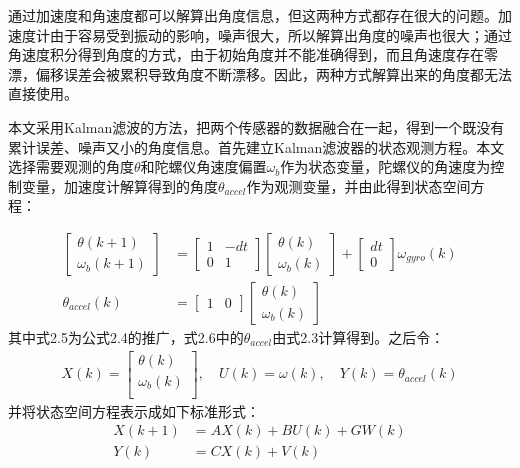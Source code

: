 通过加速度和角速度都可以解算出角度信息，但这两种方式都存在很大的问题。加速度计由于容易受到振动的影响，噪声很大，所以解算出角度的噪声也很大；通过角速度积分得到角度的方式，由于初始角度并不能准确得到，而且角速度存在零漂，偏移误差会被累积导致角度不断漂移。因此，两种方式解算出来的角度都无法直接使用。

本文采用Kalman滤波的方法，把两个传感器的数据融合在一起，得到一个既没有累计误差、噪声又小的角度信息。首先建立Kalman滤波器的状态观测方程。本文选择需要观测的角度$\theta$和陀螺仪角速度偏置$\omega_b$作为状态变量，陀螺仪的角速度为控制变量，加速度计解算得到的角度$\theta_{accel}$作为观测变量，并由此得到状态空间方程：

\begin{align}
\begin{bmatrix} \theta(k+1)  \\ \omega_b(k+1)   \end{bmatrix} &= \begin{bmatrix} 1 & -dt \\ 0 & 1   \end{bmatrix}\begin{bmatrix} \theta(k)  \\ \omega_b(k) \end{bmatrix} + \begin{bmatrix} dt \\ 0  \end{bmatrix} \omega_{gyro}(k) \\
\theta_{accel}(k) &=\begin{bmatrix} 1 & 0  \end{bmatrix}  \begin{bmatrix} \theta(k) \\ \omega_b(k)  \end{bmatrix}
\end{align}
其中式2.5为公式2.4的推广，式2.6中的$\theta_{accel}$由式2.3计算得到。之后令：
\begin{align}
X(k) = \begin{bmatrix} \theta(k)  \\ \omega_{b}(k) \\  \end{bmatrix}, \quad U(k) = \omega(k), \quad Y(k) = \theta_{accel}(k)
\end{align}
并将状态空间方程表示成如下标准形式：
\begin{align}
X(k+1) &= A X(k) + B U(k) + G W(k) \\
Y(k) &= C X(k) + V(k)
\end{align}

